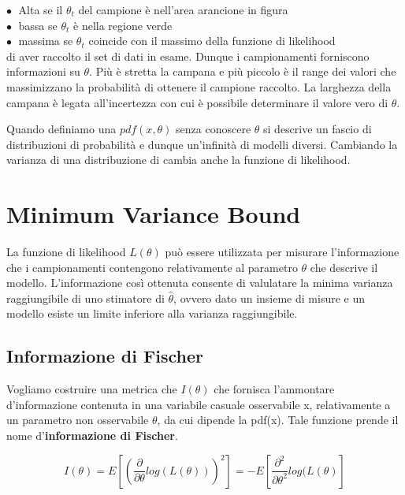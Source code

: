 \noindent $\bullet \;$  Alta se il $\theta_{t}$ del campione \`{e} nell'area arancione in figura \\
\noindent $\bullet \;$ bassa se $\theta_{t}$ \`{e} nella regione verde \\
\noindent $\bullet \;$ massima se $\theta_{t}$ coincide con il massimo della funzione di likelihood \\
 
\noindent di aver raccolto il set di dati in esame. Dunque i campionamenti forniscono informazioni su $\theta$. Pi\`{u} \`{e} stretta la campana e pi\`{u} piccolo \`{e} il range dei valori che massimizzano la probabilit\`{a} di ottenere il campione raccolto. La larghezza della campana \`{e} legata all'incertezza con cui \`{e} possibile determinare il valore vero di $\theta$.
\newline

\noindent Quando definiamo una $pdf(x,\theta)$ senza conoscere $\theta$ si descrive un fascio di distribuzioni di probabilit\`{a} e dunque un'infinit\`{a} di modelli diversi. Cambiando la varianza di una distribuzione di cambia anche la funzione di likelihood.

\section{Minimum Variance Bound}

La funzione di likelihood $L(\theta)$ pu\`{o} essere utilizzata per misurare l'informazione che i campionamenti contengono relativamente al parametro $\theta$ che descrive il modello. L'informazione cos\`{i} ottenuta consente di valulatare la minima varianza  raggiungibile di uno stimatore di $\hat{\theta}$, ovvero dato un insieme di misure e un modello  esiste un limite inferiore  alla varianza raggiungibile.

\subsection{Informazione di Fischer}

Vogliamo costruire una metrica che $I ( \theta)$ che fornisca l'ammontare d'informazione contenuta in una variabile casuale osservabile x, relativamente a un parametro non osservabile $\theta$, da cui dipende la pdf(x). Tale funzione  prende il nome d'\textbf{informazione di Fischer}.

\begin{equation*}
		I(\theta) = E[(\frac{\partial}{\partial \theta}log(L(\theta)))^2] = -E[\frac{\partial^2}{\partial\theta^2}log(L(\theta)]
\end{equation*}

